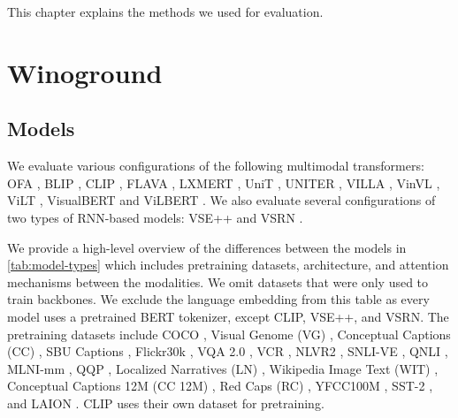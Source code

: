 This chapter explains the methods we used for evaluation.

\section{Winoground}

\subsection{Models}

We evaluate various configurations of the following multimodal transformers: OFA \cite{wang2022unifying}, BLIP \cite{li2022blip}, CLIP \cite{radford2021clip}, FLAVA \cite{singh2022flava}, LXMERT \cite{tan2020lxmert}, UniT \cite{hu2021unit}, UNITER \cite{chen2020uniter}, VILLA \cite{gan2020villa}, VinVL \cite{zhang2021vinvl}, ViLT \cite{kim2021vilt}, VisualBERT \cite{li2019visualbert} and ViLBERT \cite{lu2019vilbert}. We also evaluate several configurations of two types of RNN-based models: VSE++ \cite{faghri2018vse} and VSRN \cite{li2019vsrn}.

We provide a high-level overview of the differences between the models in \cref{tab:model-types} which includes pretraining datasets, architecture, and attention mechanisms between the modalities. We omit datasets that were only used to train backbones. We exclude the language embedding from this table as every model uses a pretrained BERT tokenizer, except CLIP, VSE++, and VSRN. The pretraining datasets include COCO \cite{lin2014microsoft}, Visual Genome (VG) \cite{krishna2016visual}, Conceptual Captions (CC) \cite{sharma2018conceptual}, SBU Captions \cite{ordonez2011im2text}, Flickr30k \cite{young2014image}, VQA 2.0 \cite{goyal2017making}, VCR \cite{zellers2019recognition}, NLVR2 \cite{suhr2017corpus}, SNLI-VE \cite{xie2018visual}, QNLI \cite{rajpurkar2016squad}, MLNI-mm \cite{williams2017broad}, QQP \cite{QQPDataset}, Localized Narratives (LN) \cite{pont-tuset2020localized-narratives}, Wikipedia Image Text (WIT) \cite{srinivasan2021wit}, Conceptual Captions 12M (CC 12M) \cite{changpinyo2021conceptual12m}, Red Caps (RC) \cite{desai2021redcaps}, YFCC100M \cite{thomee2016yfcc100m}, SST-2 \cite{Socher2013RecursiveDM}, and LAION \cite{schuhmann2021laion}. CLIP uses their own dataset for pretraining.

